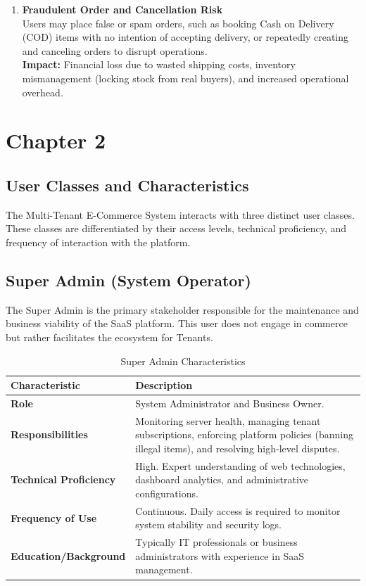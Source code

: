 \begin{enumerate}
    \item \textbf{Fraudulent Order and Cancellation Risk} \\
    Users may place false or spam orders, such as booking Cash on Delivery (COD) items with no intention of accepting delivery, or repeatedly creating and canceling orders to disrupt operations. \\
    \textbf{Impact:} Financial loss due to wasted shipping costs, inventory mismanagement (locking stock from real buyers), and increased operational overhead.
\end{enumerate}

\section{Chapter 2}
\subsection{User Classes and Characteristics}
\label{sec:user-classes}
The Multi-Tenant E-Commerce System interacts with three distinct user classes. These classes are differentiated by their access levels, technical proficiency, and frequency of interaction with the platform.

\subsection*{Super Admin (System Operator)}
\label{subsec:super-admin}
The Super Admin is the primary stakeholder responsible for the maintenance and business viability of the SaaS platform. This user does not engage in commerce but rather facilitates the ecosystem for Tenants.

\begin{table}[H]
\centering
\begin{tabular}{|p{4.5cm}|p{10cm}|}
\hline
\textbf{Characteristic} & \textbf{Description} \\
\hline
\textbf{Role} & System Administrator and Business Owner. \\
\hline
\textbf{Responsibilities} & Monitoring server health, managing tenant subscriptions, enforcing platform policies (banning illegal items), and resolving high-level disputes. \\
\hline
\textbf{Technical Proficiency} & High. Expert understanding of web technologies, dashboard analytics, and administrative configurations. \\
\hline
\textbf{Frequency of Use} & Continuous. Daily access is required to monitor system stability and security logs. \\
\hline
\textbf{Education/Background} & Typically IT professionals or business administrators with experience in SaaS management. \\
\hline
\end{tabular}
\caption{Super Admin Characteristics}
\label{tab:super-admin}
\end{table}

